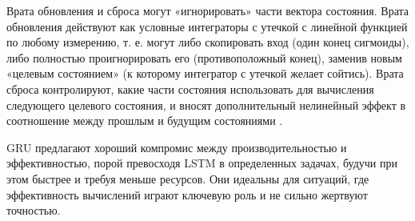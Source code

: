 Врата обновления и сброса могут «игнорировать» части вектора состояния. 
Врата обновления действуют как условные интеграторы с утечкой с линейной
функцией по любому измерению, т. е. могут либо скопировать вход (один конец 
сигмоиды), либо полностью проигнорировать его (противоположный конец), заменив
новым «целевым состоянием» (к которому интегратор с утечкой желает сойтись).
Врата сброса контролируют, какие части состояния использовать для вычисления 
следующего целевого состояния, и вносят дополнительный нелинейный эффект в 
соотношение между прошлым и будущим состояниями \cite{Goodfellow-et-al-2016}.

GRU предлагают хороший компромис между производительностью и эффективностью, 
порой превосходя LSTM в определенных задачах, будучи при этом быстрее и 
требуя меньше ресурсов. Они идеальны для ситуаций, где эффективность 
вычислений играют ключевую роль и не сильно жертвуют точностью.

